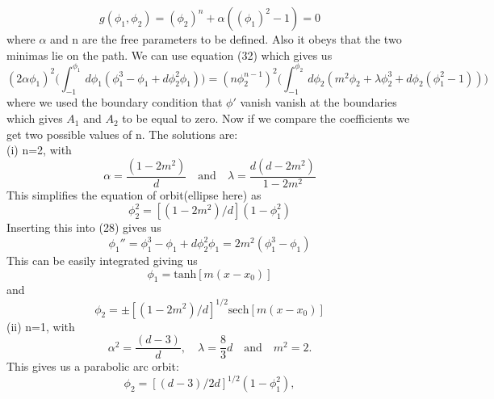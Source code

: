 \documentclass[a4paper, 12pt]{article}
\begin{document}
 \begin{equation}%
g(\phi_1,\phi_2) = (\phi_2)^n + \alpha((\phi_1)^2 - 1 ) = 0
 \end{equation}
where $\alpha$ and n are the free parameters to be defined. Also it obeys that the two minimas lie on the path.
We can use equation (32) which gives us
 \begin{equation}%
(2\alpha\phi_1)^2 \bigg(\int_{-1}^{\phi_1} d\phi_1 (\phi_1^3 -\phi_1 + d\phi_2^2 \phi_1) \bigg) = (n\phi_2^{n-1})^2 \bigg(\int_{-1}^{\phi_2} d\phi_2 (m^2\phi_2 +\lambda \phi_2^3 + d\phi_2 (\phi_1^2 - 1)) \bigg)
 \end{equation}
where we used the boundary condition that $\phi'$ vanish vanish at the boundaries which gives $A_1$ and $A_2$ to be equal to zero. Now if we compare the coefficients we get two possible values of n. The solutions are: \\
(i) n=2, with \\
 \begin{equation}%
\alpha = \frac{(1-2m^2)}{d} \quad \textrm{and} \quad \lambda = \frac{d(d - 2m^2)}{1 - 2m^2}
 \end{equation}
 This simplifies  the equation of orbit(ellipse here) as
  \begin{equation}%
\phi_2^2 = [(1 - 2m^2)/d](1 - \phi_1^2)
 \end{equation}
 Inserting this into (28) gives us 
  \begin{equation}%
\phi_1'' = \phi_1^3 - \phi_1 + d\phi_2^2 \phi_1 = 2m^2 (\phi_1^3 - \phi_1)
 \end{equation}
 This can be easily integrated giving us
  \begin{equation}%
\phi_1 = \textrm{tanh}[m(x-x_0)]
 \end{equation}
 and
   \begin{equation}%
\phi_2 = \pm [(1 - 2m^2)/d]^{1/2} \textrm{sech}[m(x-x_0)]
 \end{equation}
(ii) n=1, with \\
 \begin{equation}%
\alpha^2 = \frac{(d - 3)}{d},  \quad \lambda = \frac{8}{3}d \quad \textrm{and} \quad m^2 = 2.
 \end{equation}
 This gives us a parabolic arc orbit:
  \begin{equation}%
\phi_2 = [(d - 3)/2d]^{1/2}(1 - \phi_1^2),
 \end{equation} 
\end{document}
